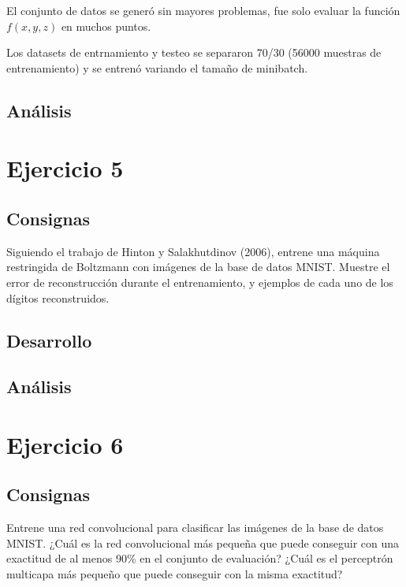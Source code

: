 \documentclass[11pt]{article} %
\begin{document}
El conjunto de datos se generó sin mayores problemas, fue solo evaluar la función $f(x,y,z)$ en muchos puntos.

Los datasets de entrnamiento y testeo se separaron 70/30 (56000 muestras de entrenamiento) y se entrenó variando el tamaño de minibatch.


\subsection{Análisis}




\clearpage

\section{Ejercicio 5}

\subsection{Consignas}

Siguiendo el trabajo de Hinton y Salakhutdinov (2006), entrene una máquina restringida de Boltzmann con imágenes de la base de datos MNIST. Muestre el error de reconstrucción durante el entrenamiento, y ejemplos de cada uno de los dígitos reconstruidos.
\subsection{Desarrollo}

\subsection{Análisis}

\clearpage

\section{Ejercicio 6}

\subsection{Consignas}

Entrene una red convolucional para clasificar las imágenes de la base de datos MNIST.
¿Cuál es la red convolucional más pequeña que puede conseguir con una exactitud de al menos 90\% en el conjunto de evaluación? ¿Cuál es el perceptrón multicapa más pequeño que puede conseguir con la misma exactitud?
\end{document}
